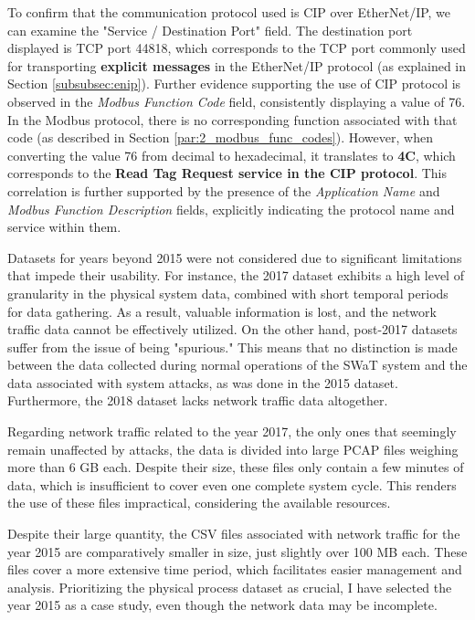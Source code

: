 To confirm that the communication protocol used is CIP over EtherNet/IP, we can examine the "Service / Destination Port" field. The destination port displayed is TCP port 44818, which corresponds to the TCP port commonly used for transporting \textbf{explicit messages} in the EtherNet/IP protocol (as explained in Section \ref{subsubsec:enip}).
Further evidence supporting the use of CIP protocol is observed in the \textit{Modbus Function Code} field, consistently displaying a value of 76. In the Modbus protocol, there is no corresponding function associated with that code (as described in Section \ref{par:2_modbus_func_codes}). However, when converting the value 76 from decimal to hexadecimal, it translates to \textbf{4C}, which corresponds to the \textbf{Read Tag Request service in the CIP protocol}. This correlation is further supported by the presence of the \textit{Application Name} and \textit{Modbus Function Description} fields, explicitly indicating the protocol name and service within them.

\bigskip
Datasets for years beyond 2015 were not considered due to significant limitations that impede their usability. For instance, the 2017 dataset exhibits a high level of granularity in the physical system data, combined with short temporal periods for data gathering. As a result, valuable information is lost, and the network traffic data cannot be effectively utilized. On the other hand, post-2017 datasets suffer from the issue of being "spurious." This means that no distinction is made between the data collected during normal operations of the SWaT system and the data associated with system attacks, as was done in the 2015 dataset. Furthermore, the 2018 dataset lacks network traffic data altogether.

Regarding network traffic related to the year 2017, the only ones that seemingly remain unaffected by attacks, the data is divided into large PCAP files weighing more than 6 GB each. Despite their size, these files only contain a few minutes of data, which is insufficient to cover even one complete system cycle. This renders the use of these files impractical, considering the available resources.

\bigskip
Despite their large quantity, the CSV files associated with network traffic for the year 2015 are comparatively smaller in size, just slightly over 100 MB each. These files cover a more extensive time period, which facilitates easier management and analysis. Prioritizing the physical process dataset as crucial, I have selected the year 2015 as a case study, even though the network data may be incomplete.

\vfill
